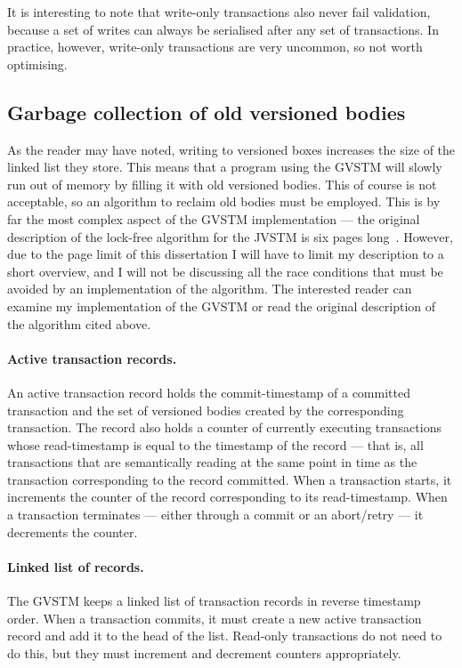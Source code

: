 \documentclass[12pt,a4paper,oneside,openright]{report}
\begin{document}
It is interesting to note that write-only transactions also never fail
validation, because a set of writes can always be serialised after any
set of transactions. In practice, however, write-only transactions are
very uncommon, so not worth optimising.

\subsection{Garbage collection of old versioned bodies}
\label{sec:impl:garbage-collection}

As the reader may have noted, writing to versioned boxes increases the
size of the linked list they store. This means that a program using
the GVSTM will slowly run out of memory by filling it with old
versioned bodies. This of course is not acceptable, so an algorithm to
reclaim old bodies must be employed. This is by far the most complex
aspect of the GVSTM implementation --- the original description of the
lock-free algorithm for the JVSTM is six pages
long~\cite[Section~4.4.7]{cachopo2007phd}.  However, due to the page
limit of this dissertation I will have to limit my description to a
short overview, and I will not be discussing all the race conditions
that must be avoided by an implementation of the algorithm. The
interested reader can examine my implementation of the GVSTM or read
the original description of the algorithm cited above.

\paragraph{Active transaction records.} An active transaction record
holds the commit-timestamp of a committed transaction and the set of
versioned bodies created by the corresponding transaction. The record
also holds a counter of currently executing transactions whose
read-timestamp is equal to the timestamp of the record --- that is,
all transactions that are semantically reading at the same point in
time as the transaction corresponding to the record committed. When a
transaction starts, it increments the counter of the record
corresponding to its read-timestamp. When a transaction terminates ---
either through a commit or an abort/retry --- it decrements the
counter.

\paragraph{Linked list of records.} The GVSTM keeps a linked list of
transaction records in reverse timestamp order. When a transaction
commits, it must create a new active transaction record and add it to
the head of the list. Read-only transactions do not need to do this,
but they must increment and decrement counters appropriately.
\end{document}
